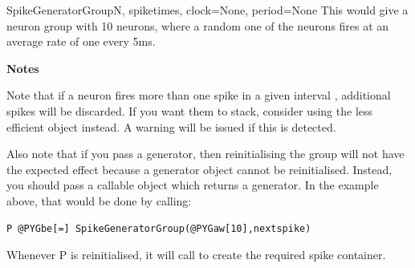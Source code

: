 \documentclass[letterpaper,10pt]{manual}
\begin{document}
\begin{classdesc}{SpikeGeneratorGroup}{N, spiketimes, clock=None, period=None}
This would give a neuron group  with 10 neurons, where a random one
of the neurons fires at an average rate of one every 5ms.

\textbf{Notes}

Note that if a neuron fires more than one spike in a given interval , additional
spikes will be discarded. If you want them to stack, consider using the less efficient
\hyperlink{brian.MultipleSpikeGeneratorGroup}{} object instead. A warning will be issued if this
is detected.

Also note that if you pass a generator, then reinitialising the group will not have the
expected effect because a generator object cannot be reinitialised. Instead, you should
pass a callable object which returns a generator. In the example above, that would be
done by calling:

\begin{Verbatim}[commandchars=@\[\]]
P @PYGbe[=] SpikeGeneratorGroup(@PYGaw[10],nextspike)
\end{Verbatim}

Whenever P is reinitialised, it will call  to create the required spike
container.
\end{classdesc}
\end{document}
